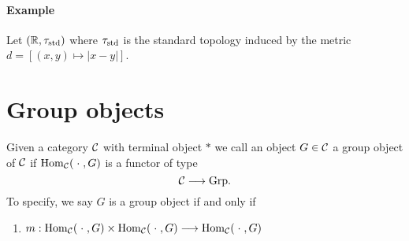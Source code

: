 \paragraph{Example} Let $(\mathbb{R}, \tau_{\mathrm{std}})$ where $\tau_{\mathrm{std}}$ is the standard topology induced by the metric $d = \left[(x,y) \longmapsto |x - y|\right]$.
\section{Group objects}
Given a category $\mathcal{C}$ with terminal object $\ast$ we call an object $G \in \mathcal{C}$ a group object of $\mathcal{C}$ if $\mathrm{Hom}_{\mathcal{C}}(\;\cdot\;,G)$ is a functor of type
$$\mathcal{C} \longrightarrow \mathrm{Grp}.$$
To specify, we say $G$ is a group object if and only if\\
\begin{enumerate}
\item $m : \mathrm{Hom}_{\mathcal{C}}(\;\cdot\;,G) \times \mathrm{Hom}_{\mathcal{C}}(\;\cdot\;,G) \longrightarrow \mathrm{Hom}_{\mathcal{C}}(\;\cdot\;,G)$
\end{enumerate}